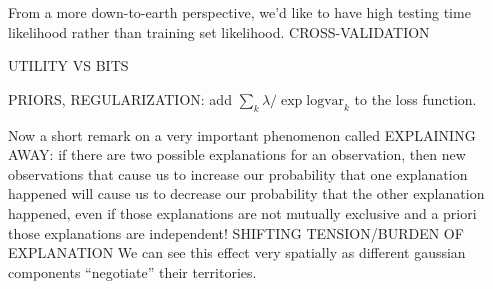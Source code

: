 From a more down-to-earth perspective, we'd like to have high testing time
likelihood rather than training set likelihood.  CROSS-VALIDATION

UTILITY VS BITS

PRIORS, REGULARIZATION: add $\sum_k \lambda/\exp \text{logvar}_k$ to the loss
function.


Now a short remark on a very important phenomenon called EXPLAINING AWAY: if
there are two possible explanations for an observation, then new observations
that cause us to increase our probability that one explanation happened will
cause us to decrease our probability that the other explanation happened, even
if those explanations are not mutually exclusive and a priori those
explanations are independent!  SHIFTING TENSION/BURDEN OF EXPLANATION
%
We can see this effect very spatially as different gaussian components
``negotiate'' their territories.  




%
%
%



